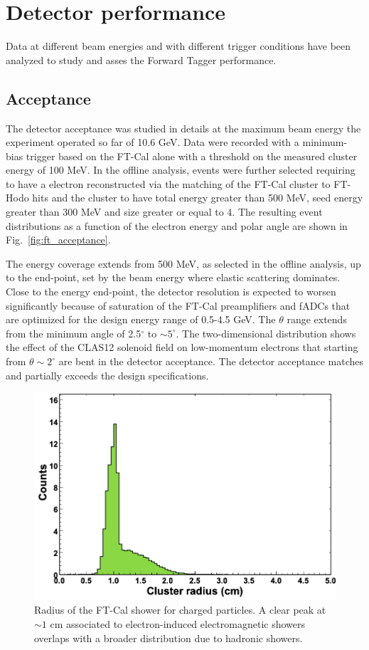 \section{Detector performance}
Data at different beam energies and with different trigger conditions have been analyzed to study and asses the Forward Tagger performance. 

\subsection{Acceptance}
The detector acceptance was studied in details at the maximum beam energy the experiment operated so far of 10.6 GeV. Data were recorded with a minimum-bias trigger based on the FT-Cal alone with a threshold on the measured cluster energy of 100 MeV. 
In the offline analysis, events were further selected requiring to have a electron reconstructed via the matching of the FT-Cal cluster to FT-Hodo hits and the cluster to have total energy greater than 500 MeV, seed energy greater than 300 MeV and size greater or equal to 4. The resulting event distributions as a function of the electron energy and polar angle are shown in Fig.~\ref{fig:ft_acceptance}. 

The energy coverage extends from 500 MeV, as selected in the offline analysis, up to the end-point, set by the beam energy where elastic scattering dominates. Close to the energy end-point, the detector resolution is expected to worsen significantly because of saturation of the FT-Cal preamplifiers and fADCs that are optimized for the design energy range of 0.5-4.5 GeV. The $\theta$ range extends from the minimum angle of 2.5$^\circ$ to $\sim5^\circ$. The two-dimensional distribution shows the effect of the CLAS12 solenoid field on low-momentum electrons that starting from $\theta\sim2^\circ$ are bent in the detector acceptance. The detector acceptance matches and partially exceeds the design specifications. 

\begin{figure}[h]
\includegraphics[height=0.65\columnwidth]{fig/ft_shower.png}
\caption{Radius of the FT-Cal shower for charged particles. A clear peak at $\sim 1$ cm associated to electron-induced electromagnetic showers overlaps with a broader distribution due to hadronic showers.}
\label{fig:ft_shower}
\end{figure}
